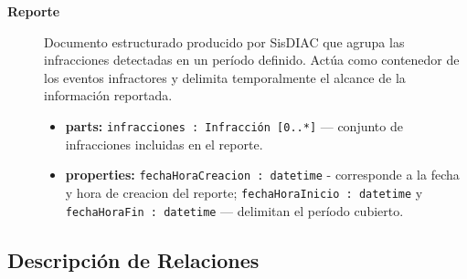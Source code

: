 \documentclass[12pt,letterpaper]{article}
\begin{document}
{\begin{description}
		\item[\textbf{Reporte}]
		      Documento estructurado producido por SisDIAC que agrupa las infracciones detectadas en un período definido. Actúa como contenedor de los eventos infractores y delimita temporalmente el alcance de la información reportada.
		      \begin{itemize}
			      \item \textbf{parts:} \texttt{infracciones : Infracción [0..*]} — conjunto de infracciones incluidas en el reporte.
			      \item \textbf{properties:} \texttt{fechaHoraCreacion : datetime} - corresponde a la fecha y hora de creacion del reporte; \texttt{fechaHoraInicio : datetime} y \texttt{fechaHoraFin : datetime} — delimitan el período cubierto.
		      \end{itemize}

	\end{description}
}

\subsection{Descripción de Relaciones}
\end{document}

